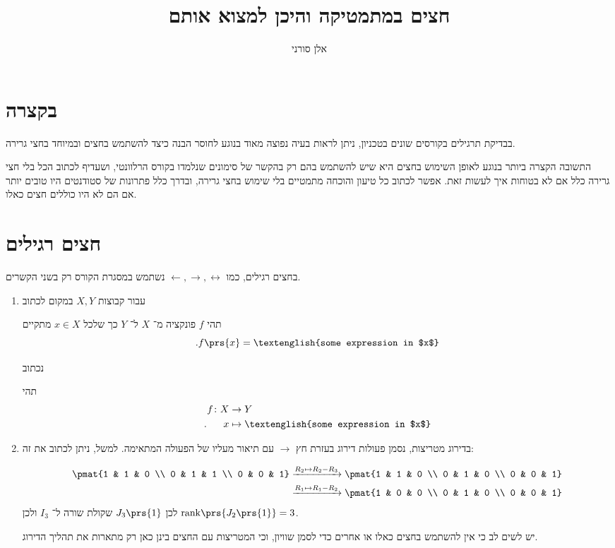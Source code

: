 \documentclass[a4paper,10pt,twoside,openany]{article}
\title{
חצים במתמטיקה והיכן למצוא אותם
}
\author{אלן סורני}
\date{}
\renewenvironment{quote}
  {\begin{tcolorbox}[
      colback=white,
      colframe=black,
      boxrule=0.5pt,
      left=2mm,
      right=2mm,
      top=1mm,
      bottom=1mm
    ]}
  {\end{tcolorbox}}
\begin{document}
\maketitle

\section{בקצרה}

בבדיקת תרגילים בקורסים שונים בטכניון, ניתן לראות בעיה נפוצה מאוד בנוגע לחוסר הבנה כיצד להשתמש בחצים ובמיוחד בחצי גרירה.

התשובה הקצרה ביותר בנוגע לאופן השימוש בחצים היא שיש להשתמש בהם רק בהקשר של סימונים שנלמדו בקורס הרלוונטי, ושעדיף לכתוב הכל בלי חצי גרירה כלל אם לא בטוחות איך לעשות זאת. אפשר לכתוב כל טיעון והוכחה מתמטיים בלי שימוש בחצי גרירה, ובדרך כלל פתרונות של סטודנטים היו טובים יותר אם הם לא היו כוללים חצים כאלו.

\section{חצים רגילים}

בחצים רגילים, כמו
$\leftarrow, \rightarrow, \leftrightarrow$
נשתמש במסגרת הקורס רק בשני הקשרים.

\begin{enumerate}
\item
עבור קבוצות
$X,Y$
במקום לכתוב
\begin{quote}
תהי
$f$
פונקציה מ־%
$X$
ל־%
$Y$
כך שלכל
$x \in X$
מתקיים
\[\text{.} f\prs{x} = \text{\textenglish{some expression in $x$}}\]
\end{quote}
נכתוב
\begin{quote}
תהי
\begin{align*}
f \colon X &\to Y \\
\text{.} \hphantom{lala} x &\mapsto \text{\textenglish{some expression in $x$}}
\end{align*}
\end{quote}
\item
בדירוג מטריצות, נסמן פעולות דירוג בעזרת חץ
$\rightarrow$
עם תיאור מעליו של הפעולה המתאימה. למשל, ניתן לכתוב את זה:
\begin{quote}
\begin{align*}
\pmat{1 & 1 & 0 \\ 0 & 1 & 1 \\ 0 & 0 & 1} &\xrightarrow{R_2 \mapsto R_2 - R_3}
\pmat{1 & 1 & 0 \\ 0 & 1 & 0 \\ 0 & 0 & 1}
\\&\xrightarrow{R_1 \mapsto R_1 - R_2}
\pmat{1 & 0 & 0 \\ 0 & 1 & 0 \\ 0 & 0 & 1}
\end{align*}
לכן
$J_3\prs{1}$
שקולת שורה ל־%
$I_3$
ולכן
$\mathrm{rank}\prs{J_2\prs{1}} = 3$.
\end{quote}

יש לשים לב כי אין להשתמש בחצים כאלו או אחרים כדי לסמן שוויון, וכי המטריצות עם החצים בינן כאן רק מתארות את תהליך הדירוג.
\end{enumerate}
\end{document}
